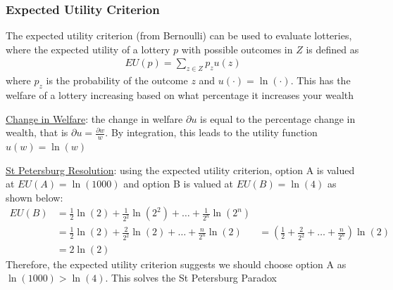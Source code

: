 \documentclass{article}
\begin{document}
\subsubsection{Expected Utility Criterion}
The expected utility criterion (from Bernoulli) can be used to evaluate lotteries, where the expected utility of a lottery $p$ with possible outcomes in $Z$ is defined as
\begin{gather*}
  EU(p) = \sum_{z \in Z} p_{z}u(z)
\end{gather*}
where $p_{z}$ is the probability of the outcome $z$ and $u(\cdot) = \ln (\cdot)$. This has the welfare of a lottery increasing based on what percentage it increases your wealth
\par \vspace{0.3em}
  \underline{Change in Welfare}: the change in welfare $\partial u$ is equal to the percentage change in wealth, that is $\partial u = \tfrac{\partial w}{w}$. By integration, this leads to the utility function $u(w) = \ln (w)$
  \par
  \underline{St Petersburg Resolution}: using the expected utility criterion, option A is valued at $EU(A) = \ln(1000)$ and option B is valued at $EU(B) = \ln (4)$ as shown below:
  \begin{align*}
    EU(B) &= \frac{1}{2} \ln(2) + \frac{1}{2^{2}} \ln (2^{2}) + \dots + \frac{1}{2^{n}} \ln (2^{n}) \\
    &= \frac{1}{2} \ln(2) + \frac{2}{2^{2}} \ln(2) + \dots + \frac{n}{2^{n}} \ln (2)
    &= (\frac{1}{2} + \frac{2}{2^{2}} + \dots + \frac{n}{2^{n}}) \ln(2) \\
    &= 2 \ln(2)
  \end{align*}
  Therefore, the expected utility criterion suggests we should choose option A as $\ln (1000) > \ln(4)$. This solves the St Petersburg Paradox
  \par
\vspace{6mm}
\end{document}
